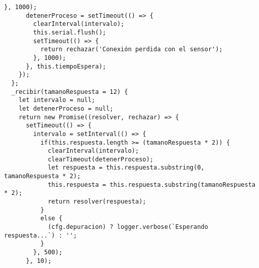 \begin{lstlisting}[label=anx:libreria_zfm20]
      }, 1000);
      detenerProceso = setTimeout(() => {
        clearInterval(intervalo);
        this.serial.flush();
        setTimeout(() => {
          return rechazar('Conexión perdida con el sensor');
        }, 1000);
      }, this.tiempoEspera);
    });
  };
  _recibir(tamanoRespuesta = 12) {
    let intervalo = null;
    let detenerProceso = null;
    return new Promise((resolver, rechazar) => {
      setTimeout(() => {
        intervalo = setInterval(() => {
          if(this.respuesta.length >= (tamanoRespuesta * 2)) {
            clearInterval(intervalo);
            clearTimeout(detenerProceso);
            let respuesta = this.respuesta.substring(0, tamanoRespuesta * 2);
            this.respuesta = this.respuesta.substring(tamanoRespuesta * 2);
            return resolver(respuesta);
          }
          else {
            (cfg.depuracion) ? logger.verbose(`Esperando respuesta...`) : '';
          }
        }, 500);
      }, 10);


\end{lstlisting}
